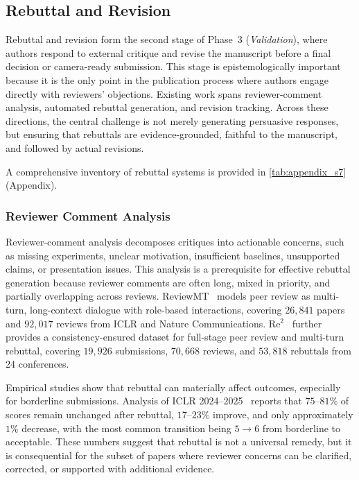 \documentclass{llmxive}
\begin{document}
\subsection{Rebuttal and Revision}
\label{sec:rebuttal}

Rebuttal and revision form the second stage of Phase~3 (\emph{Validation}), where authors respond to external critique and revise the manuscript before a final decision or camera-ready submission. This stage is epistemologically important because it is the only point in the publication process where authors engage directly with reviewers' objections. Existing work spans reviewer-comment analysis, automated rebuttal generation, and revision tracking. Across these directions, the central challenge is not merely generating persuasive responses, but ensuring that rebuttals are evidence-grounded, faithful to the manuscript, and followed by actual revisions.

A comprehensive inventory of rebuttal systems is provided in \cref{tab:appendix_s7} (Appendix).



\subsubsection{Reviewer Comment Analysis}
\label{sec:rebuttal_analysis}

Reviewer-comment analysis decomposes critiques into actionable concerns, such as missing experiments, unclear motivation, insufficient baselines, unsupported claims, or presentation issues. This analysis is a prerequisite for effective rebuttal generation because reviewer comments are often long, mixed in priority, and partially overlapping across reviews. ReviewMT~\cite{reviewmt2024} models peer review as multi-turn, long-context dialogue with role-based interactions, covering $26{,}841$ papers and $92{,}017$ reviews from ICLR and Nature Communications. Re$^2$~\cite{re2dataset2025} further provides a consistency-ensured dataset for full-stage peer review and multi-turn rebuttal, covering $19{,}926$ submissions, $70{,}668$ reviews, and $53{,}818$ rebuttals from 24 conferences.

Empirical studies show that rebuttal can materially affect outcomes, especially for borderline submissions. Analysis of ICLR 2024--2025~\cite{iclr_rebuttal2025} reports that $75$--$81\%$ of scores remain unchanged after rebuttal, $17$--$23\%$ improve, and only approximately $1\%$ decrease, with the most common transition being $5 \rightarrow 6$ from borderline to acceptable. These numbers suggest that rebuttal is not a universal remedy, but it is consequential for the subset of papers where reviewer concerns can be clarified, corrected, or supported with additional evidence.
\end{document}
